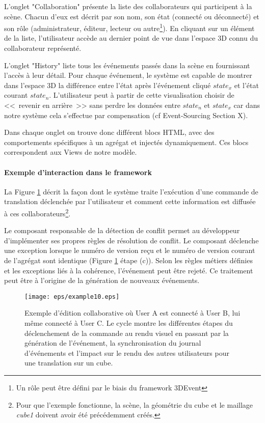 L'onglet "Collaboration" présente la liste des collaborateurs qui participent à la 
scène. Chacun d'eux est décrit par son nom, son état  (connecté ou déconnecté) 
et son rôle (administrateur, éditeur, lecteur ou autre\footnote{Un rôle peut être 
	défini par le biais du \gls{framework} 3DEvent}). En cliquant sur un élément de 
	la 
liste, l'utilisateur accède au dernier point de vue dans l'espace 3D connu du 
collaborateur représenté.

L'onglet "History" liste tous les événements passés dans la scène en fournissant 
l'accès à leur détail. Pour chaque événement, le système est capable de montrer 
dans l'espace 3D la différence entre l'état  après l'événement cliqué $state_x$ et 
l'état courant $state_n$. L'utilisateur peut à partir de cette visualisation choisir de 
<<~revenir en arrière~>> sans perdre les données entre $state_n$ et $state_x$ 
car dans notre système cela s'effectue par compensation (cf Event-Sourcing 
Section X).

Dans chaque onglet on trouve donc différent blocs \gls{HTML}, avec des 
comportements spécifiques à un agrégat et injectés dynamiquement. Ces blocs 
correspondent aux Views de notre modèle.
\paragraph{Exemple d'interaction dans le framework}
La Figure \ref{fig:cqrs-example} décrit la façon dont le système traite l'exécution 
d'une commande de translation déclenchée par l'utilisateur et comment cette 
information est diffusée à ces collaborateurs\footnote{Pour que l'exemple 
fonctionne, la scène, 
la géométrie du cube et le maillage \textit{cube1} doivent avoir été précédemment 
créés.}. 


Le composant responsable de la détection de conflit permet au développeur 
d'implémenter ses propres règles de résolution de conflit. Le composant déclenche 
une exception lorsque le numéro de version reçu et le numéro de version courant 
de l'agrégat sont identique (Figure \ref{fig:cqrs-example} étape (c)). Selon les 
règles métiers définies et les exceptions liés à la cohérence, l'événement peut être 
rejeté. Ce traitement peut être à l'origine de la génération de nouveaux 
événements.


\begin{figure}[]
	\centering
	\texttt{[image: eps/example10.eps]}
	\caption[Flux de la collaboration dans le framework 3DEvent entre 3 
	utilisateurs]{Exemple d'édition collaborative où User A est connecté à User  B, 
		lui 
		même connecté à User C. Le cycle montre les différentes étapes du 
		déclenchement de la commande au rendu visuel en passant par la 
		génération 
		de l'événement, la 
		synchronisation du journal d'événements et l'impact sur le rendu des autres 
		utilisateurs pour une translation sur un cube.}\label{fig:cqrs-example}
\end{figure}
